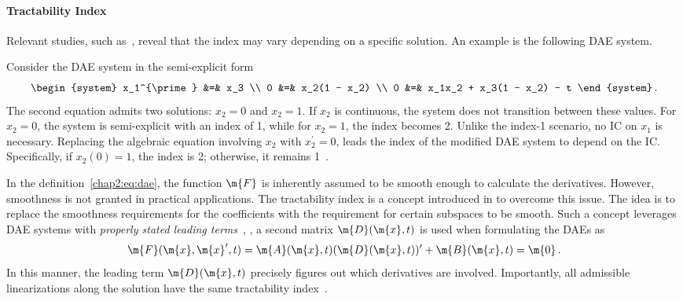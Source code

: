 \paragraph{Tractability Index}

Relevant studies, such as~\cite{lamour2013differential}, reveal that the index may vary depending on a specific solution. An example is the following \ac{DAE} system.

\begin{example}
  Consider the \ac{DAE} system in the semi-explicit form
  \begin{equation*}
    \begin{system}
    x_1^{\prime} &=& x_3 \\
    0            &=& x_2(1 - x_2) \\
    0            &=& x_1x_2 + x_3(1 - x_2) - t
    \end{system} \, \text{.}
  \end{equation*}
  The second equation admits two solutions: $x_2 = 0$ and $x_2 = 1$. If $x_2$ is continuous, the system does not transition between these values. For $x_2 = 0$, the system is semi-explicit with an index of 1, while for $x_2 = 1$, the index becomes 2. Unlike the index-1 scenario, no \ac{IC} on $x_1$ is necessary. Replacing the algebraic equation involving $x_2$ with $x_2^{\prime} = 0$, leads the index of the modified \ac{DAE} system to depend on the \ac{IC}. Specifically, if $x_2(0) = 1$, the index is 2; otherwise, it remains 1~\cite[Section 3.3]{lamour2013differential}.
\end{example}

In the definition~\eqref{chap2:eq:dae}, the function $\m{F}$ is inherently assumed to be smooth enough to calculate the derivatives. However, smoothness is not granted in practical applications. The tractability index is a concept introduced in \citet{griepentrog1986differential, marz2002index} to overcome this issue. The idea is to replace the smoothness requirements for the coefficients with the requirement for certain subspaces to be smooth. Such a concept leverages \ac{DAE} systems with \emph{properly stated leading terms}~\cite{lamour2013differential}, \ie{}, a second matrix $\m{D}(\m{x}, t)$ is used when formulating the \acp{DAE} as
%
\begin{equation*}
  \m{F}(\m{x}, \m{x}^{\prime}, t) = \m{A}(\m{x}, t) (\m{D}(\m{x}, t))^{\prime} + \m{B}(\m{x}, t) = \m{0} \, \text{.}
\end{equation*}
%
In this manner, the leading term $\m{D}(\m{x}, t)$ precisely figures out which derivatives are involved. Importantly, all admissible linearizations along the solution have the same tractability index~\cite{marz2005characterizing}.

